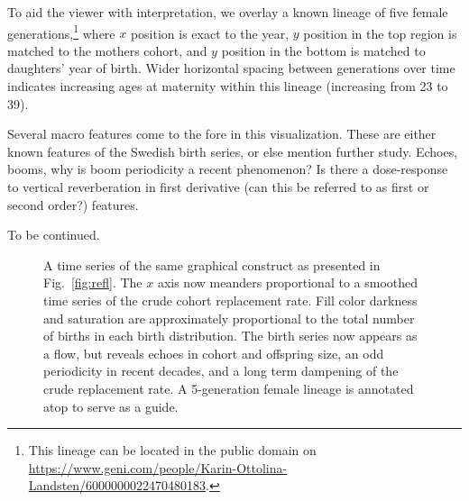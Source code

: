 \documentclass{article}
\begin{document}
To aid the viewer with interpretation, we overlay a known lineage of five female generations,\footnote{This lineage can be located in the public domain on \url{https://www.geni.com/people/Karin-Ottolina-Landsten/6000000022470480183}.} where $x$ position is exact to the year, $y$ position in the top region is matched to the mothers cohort, and $y$ position in the bottom is matched to daughters' year of birth. Wider horizontal spacing between generations over time indicates increasing ages at maternity within this lineage (increasing from 23 to 39).

Several macro features come to the fore in this visualization. These are either known features of the Swedish birth series, or else mention further study. Echoes, booms, why is boom periodicity a recent phenomenon? Is there a dose-response to vertical reverberation in first derivative (can this be referred to as first or second order?) features.

To be continued.

\begin{figure}
%
\caption{A time series of the same graphical construct as presented in Fig.~\ref{fig:refl}. The $x$ axis now meanders proportional to a smoothed time series of the crude cohort replacement rate. Fill color darkness and saturation are approximately proportional to the total number of births in each birth distribution. The birth series now appears as a flow, but reveals echoes in cohort and offspring size, an odd periodicity in recent decades, and a long term dampening of the crude replacement rate. A 5-generation female lineage is annotated atop to serve as a guide.}
\label{fig:foldout}
\end{figure}


\singlespacing

   
\end{document}
